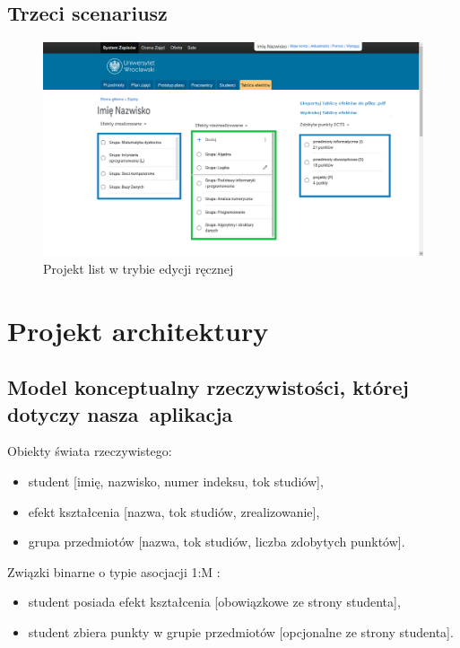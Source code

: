 \documentclass{article}
\begin{document}
\subsection{Trzeci scenariusz}
\begin{figure}[H]
	\begin{center}
		\caption{Projekt list w trybie edycji ręcznej}
		\includegraphics[scale=0.23]{edycja.png}
	\end{center}
\end{figure}


\section{Projekt architektury}

\subsection{Model konceptualny rzeczywistości, której dotyczy nasza~aplikacja}
Obiekty świata rzeczywistego:
\begin{itemize}
 \item student [imię, nazwisko, numer indeksu, tok studiów],
 \item efekt kształcenia [nazwa, tok studiów, zrealizowanie],
 \item grupa przedmiotów [nazwa, tok studiów, liczba zdobytych punktów].
\end{itemize}
Związki binarne o typie asocjacji 1:M :
\begin{itemize}
 \item student posiada efekt kształcenia [obowiązkowe ze strony studenta],
 \item student zbiera punkty w grupie przedmiotów [opcjonalne ze strony studenta].
\end{itemize}
\end{document}
